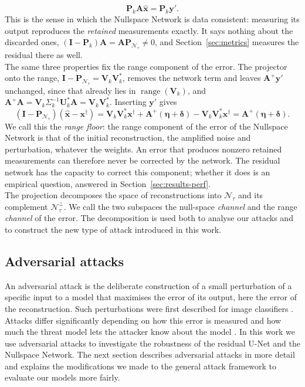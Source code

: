 \documentclass{article}
\numberwithin{equation}{section}
\begin{document}
\begin{equation}\label{eq:dc}
\mathbf{P}_k\mathbf{A}\hat{\mathbf{x}}=\mathbf{P}_k\mathbf{y}'.
\end{equation}
This is the sense in which the Nullspace Network is data consistent: measuring its output reproduces
the \emph{retained} measurements exactly. It says nothing about the discarded ones,
$(\mathbf{I}-\mathbf{P}_k)\mathbf{A}=\mathbf{A}\mathbf{P}_{\mathcal{N}_\tau}\neq0$, and
Section~\ref{sec:metrics} measures the residual there as well.\\
The same three properties fix the range component of the error. The projector onto the range,
$\mathbf{I}-\mathbf{P}_{\mathcal{N}_\tau}=\mathbf{V}_k\mathbf{V}_k^{*}$, removes the network term and leaves
$\mathbf{A}^{+}\mathbf{y}'$ unchanged, since that already lies in $\operatorname{range}(\mathbf{V}_k)$, and
$\mathbf{A}^{+}\mathbf{A}=\mathbf{V}_k\Sigma_k^{-1}\mathbf{U}_k^{*}\mathbf{A}=\mathbf{V}_k\mathbf{V}_k^{*}$.
Inserting $\mathbf{y}'$ gives
\begin{equation}\label{eq:floor}
(\mathbf{I}-\mathbf{P}_{\mathcal{N}_\tau})(\hat{\mathbf{x}}-\mathbf{x}^\dagger)
=\mathbf{V}_k\mathbf{V}_k^{*}\mathbf{x}^\dagger+\mathbf{A}^{+}(\boldsymbol{\eta}+\boldsymbol{\delta})-\mathbf{V}_k\mathbf{V}_k^{*}\mathbf{x}^\dagger
=\mathbf{A}^{+}(\boldsymbol{\eta}+\boldsymbol{\delta}).
\end{equation}
We call this the \emph{range floor}: the range component of the error of the Nullspace Network is that of
the initial reconstruction, the amplified noise and perturbation, whatever the weights. An error that
produces nonzero retained measurements can therefore never be corrected by the network. The residual
network has the capacity to correct this component; whether it does is an empirical question, answered in
Section~\ref{sec:results-perf}.\\
The projection decomposes the space of reconstructions into $\mathcal{N}_\tau$ and its complement $\mathcal{N}_\tau^\perp$.
We call the two subspaces the null-space \emph{channel} and the range \emph{channel} of the error.
The decomposition is used both to analyse our attacks and to construct the new type of attack introduced in this work.
\subsection{Adversarial attacks}
An adversarial attack is the deliberate construction of a small perturbation of a specific input to a model that maximises the error of its output, here the error of the reconstruction.
Such perturbations were first described for image classifiers \parencite{szegedy2014intriguing,goodfellow2015explaining}.
Attacks differ significantly depending on how this error is measured and how much the threat model lets the attacker know about the model \parencite{advers}.
In this work we use adversarial attacks to investigate the robustness of the residual U-Net and the Nullspace Network.
The next section describes adversarial attacks in more detail and explains the modifications we made to the general attack framework to evaluate our models more fairly.\\
\end{document}
